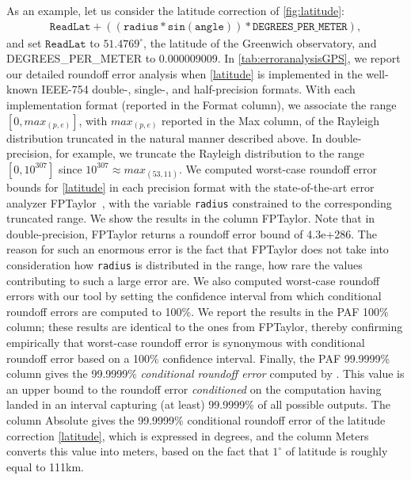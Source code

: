 As an example, let us consider the latitude correction of \cref{fig:latitude}:
\begin{align}
\mathtt{ReadLat + ((radius * sin(angle)) * DEGREES\_PER\_METER)},\label{latitude}
\end{align}
and set $\mathtt{ReadLat}$ to $51.4769^{\circ}$, the latitude of the Greenwich observatory, and DEGREES\_PER\_METER to 0.000009009.
%
In \cref{tab:erroranalysisGPS}, we report our detailed roundoff error analysis when \eqref{latitude} is implemented in the well-known IEEE-754 double-, single-, and half-precision formats.
With each implementation format (reported in the Format column), we associate the range $[0,max_{(p,e)}]$, with $max_{(p,e)}$ reported in the Max column, of the Rayleigh distribution truncated in the natural manner described above. In double-precision, for example, we truncate the Rayleigh distribution to the range $[0, 10^{307}]$ since $10^{307}\approx max_{(53,11)}$.
We computed worst-case roundoff error bounds for \eqref{latitude}  in each precision format with the state-of-the-art error analyzer FPTaylor~\cite{2015_fm_sjrg}, with the variable \texttt{radius} constrained to the corresponding truncated range. We show the results in the column FPTaylor.
%
Note that in double-precision, FPTaylor returns a roundoff error bound of 4.3e+286. 
%
The reason for such an enormous error is the fact that FPTaylor does not take into consideration how \texttt{radius} is distributed in the range, \ie how rare the values contributing to such a large error are.
%
We also computed worst-case roundoff errors with our tool \Tool by setting the confidence interval from which conditional roundoff errors are computed to 100\%. We report the results in the PAF 100\% column; these results are identical to the ones from FPTaylor,  thereby confirming empirically that worst-case roundoff error is synonymous with conditional roundoff error based on a 100\% confidence interval.
%
Finally, the PAF 99.9999\% column gives the 99.9999\% \emph{conditional roundoff error} computed by \Tool. This value is an upper bound to the roundoff error \emph{conditioned} on the computation having landed in an interval capturing (at least) 99.9999\% of all possible outputs.  The column Absolute gives the 99.9999\% conditional roundoff error of the latitude correction \eqref{latitude}, which is expressed in degrees, and the column Meters converts this value into meters, based on the fact that $1^{\circ}$ of latitude is roughly equal to 111km.
%



